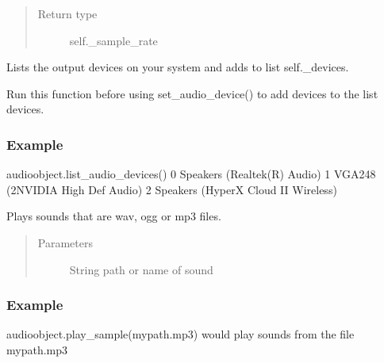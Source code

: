 \documentclass[letterpaper,10pt,english,openany,oneside]{sphinxmanual}
\begin{document}
\begin{fulllineitems}
\begin{fulllineitems}
\begin{quote}
\begin{description}
\item[{Return type}] \leavevmode
\sphinxAtStartPar
self.\_sample\_rate

\end{description}\end{quote}

\end{fulllineitems}



\begin{fulllineitems}

\pysigstartsignatures
{}
\pysigstopsignatures
\sphinxAtStartPar
Lists the output devices on your system and adds to list self.\_devices.

\sphinxAtStartPar
Run this function before using set\_audio\_device() to add devices to the list devices.
\subsubsection*{Example}

\sphinxAtStartPar
audioobject.list\_audio\_devices()
0 Speakers (Realtek(R) Audio)
1 VGA248 (2\sphinxhyphen{}NVIDIA High Def Audio)
2 Speakers (HyperX Cloud II Wireless)

\end{fulllineitems}



\begin{fulllineitems}

\pysigstartsignatures
{}
\pysigstopsignatures
\sphinxAtStartPar
Plays sounds that are wav, ogg or mp3 files.
\begin{quote}\begin{description}
\item[{Parameters}] \leavevmode
\sphinxAtStartPar
{} \textendash{} String path or name of sound

\end{description}\end{quote}
\subsubsection*{Example}

\sphinxAtStartPar
audioobject.play\_sample(mypath.mp3) would play sounds from the file mypath.mp3


\end{fulllineitems}
\end{fulllineitems}
\end{document}
